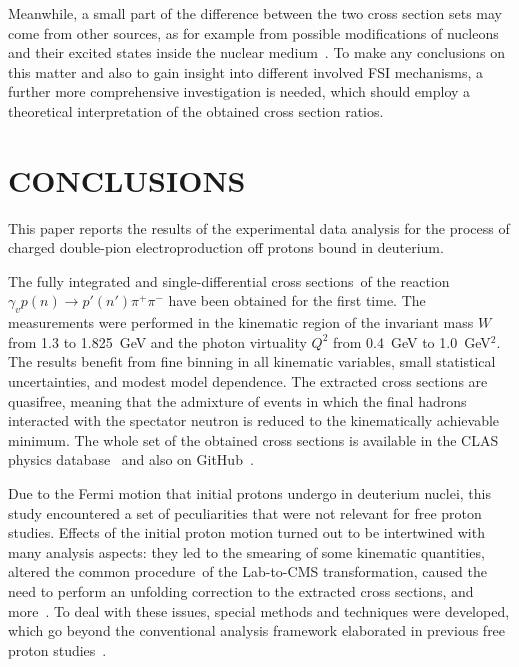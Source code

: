 \documentclass[prc,twocolumn,superscriptaddress,showpacs,amssymb,amsmath,amsfonts,aps,nofootinbib]{revtex4-1}
\begin{document}
Meanwhile, a small part of the difference between the two cross section sets may come from other sources, as for example from possible modifications of nucleons and their excited states inside the nuclear medium~\cite{Mokeev:1995fy,Bianchi:1994ax,Ahrens:1986hn,Krusche:2004xz,Noble:1980my}. To make any conclusions on this matter and also to gain insight into different involved FSI mechanisms, a further more comprehensive investigation is needed, which should employ a theoretical interpretation of the obtained cross section ratios.


\section{CONCLUSIONS}


This paper reports the results of the experimental data analysis for the process of charged double-pion electroproduction off protons bound in deuterium.

The fully integrated and single-differential cross sections~of the reaction $\gamma_{v}p(n) \rightarrow p' (n')\pi^{+}\pi^{-}$ have been obtained for the first time. The measurements were performed in the kinematic region of the invariant mass $W$ from 1.3 to 1.825~GeV and the photon virtuality $Q^{2}$ from 0.4~GeV to 1.0~GeV$^2$. The results benefit from fine binning in all kinematic variables, small statistical uncertainties, and modest model dependence. The extracted cross sections are quasifree, meaning that the admixture of events in which the final hadrons interacted with the spectator neutron is reduced to the kinematically achievable minimum. The whole set of the obtained cross sections is available in the CLAS physics database~\cite{CLAS_DB} and also on GitHub~\cite{Github:data}.

Due to the Fermi motion that initial protons undergo in deuterium nuclei, this study encountered a set of peculiarities that were not relevant for free proton studies. Effects of the initial proton motion turned out to be intertwined with many analysis aspects: they led to the smearing of some kinematic quantities, altered the common procedure~of the Lab-to-CMS transformation, caused the need to perform an unfolding correction to the extracted cross sections, and more~\cite{my_an_note:2020, my_thesis:2021, twopeg-d, note_mm_distr}. To deal with these issues, special methods and techniques were developed, which go beyond the conventional analysis framework elaborated in previous free proton studies~\cite{Rip_an_note:2002,Ripani:2002ss,Fed_an_note:2007,Fedotov:2008aa,Isupov:2017lnd,Golovach,Arjun,Fed_an_note:2017,Fed_paper_2018}.
\end{document}
